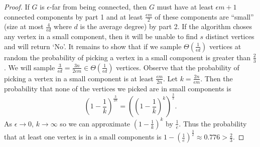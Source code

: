 \documentclass[11pt]{article}
\begin{document}
\begin{enumerate}
\begin{proof}
If $G$ is $\epsilon$-far from being connected, then $G$ must have at least $\epsilon m + 1$ connected components by part 1 and at least $\frac{\epsilon m}{2}$ of these components are ``small'' (size at most $\frac{4}{\epsilon d}$ where $d$ is the average degree) by part 2. If the algorithm choses any vertex in a small component, then it will be unable to find $s$ distinct vertices and will return `No'. It remains to show that if we sample $\Theta\left(\frac{1}{\epsilon d}\right)$ vertices at random the probability of picking a vertex in a small component is greater than $\frac{2}{3}$. We will sample $\frac{3}{\epsilon d} = \frac{3n}{2\epsilon m} \in \Theta\left(\frac{1}{\epsilon d}\right)$ vertices. Observe that the probability of picking a vertex in a small component is at least $\frac{\epsilon m}{2n}$. Let $k = \frac{2n}{\epsilon m}$. Then the probability that none of the vertices we picked are in small components is 
\[\left(1 - \frac{1}{k}\right)^{\frac{3}{2k}} = \left(\left(1 - \frac{1}{k}\right)^k\right)^{\frac{3}{2}}.\]
As $\epsilon \rightarrow 0$, $k \rightarrow \infty$ so we can approximate $\left(1 - \frac{1}{k}\right)^k$ by $\frac{1}{e}$. Thus the probability that at least one vertex is in a small components is $1 - \left(\frac{1}{e}\right)^{\frac{3}{2}} \approx 0.776 > \frac{2}{3}$.
\end{proof}
\end{enumerate}
\end{document}
